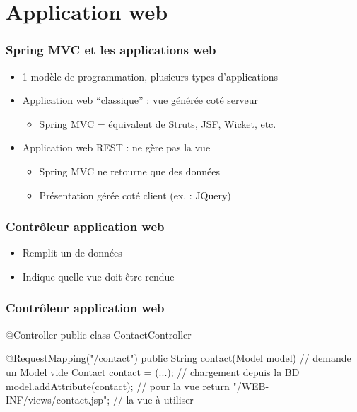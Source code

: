 \section{Application web}


\begin{frame}
 \frametitle{Spring MVC et les applications web}
 \begin{itemize}
  \item 1 modèle de programmation, plusieurs types d'applications
  \item Application web ``classique'' : vue générée coté serveur
   \begin{itemize}
    \item Spring MVC = équivalent de Struts, JSF, Wicket, etc.
   \end{itemize}
  \item Application web REST : ne gère pas la vue
  \begin{itemize}
   \item Spring MVC ne retourne que des données
   \item Présentation gérée coté client (ex. : JQuery)
  \end{itemize}
 \end{itemize}
\end{frame}

\begin{frame}
 \frametitle{Contrôleur application web}

 \begin{itemize}
  \item Remplit un  de données
  \item Indique quelle vue doit être rendue
 \end{itemize}

\end{frame}

\begin{frame}[fragile]
 \frametitle{Contrôleur application web}

 \begin{javacode}
@Controller
public class ContactController {

  @RequestMapping("/contact")
  public String contact(Model model) { // demande un Model vide
    Contact contact = (...); // chargement depuis la BD
    model.addAttribute(contact); // pour la vue
    return "/WEB-INF/views/contact.jsp"; // la vue \`a utiliser
  }

}
 \end{javacode}

\end{frame}

